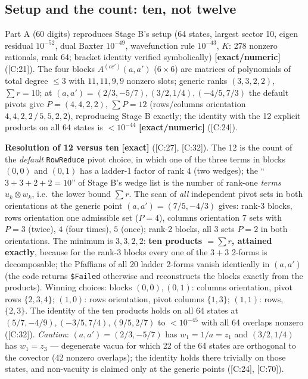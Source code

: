\documentclass[10pt]{article}
\newcommand{\cl}[2]{\textsf{[#1:#2]}}
\newcommand{\tg}[1]{\textbf{[#1]}}
\begin{document}
\subsection{Setup and the count: ten, not twelve}\label{sec:Ccount}

Part A (60 digits) reproduces Stage B's setup (64 states, largest sector 10, eigen residual $10^{-52}$, dual Baxter $10^{-49}$, wavefunction rule $10^{-43}$, $K$: 278 nonzero rationals, rank 64; bracket identity verified symbolically) \tg{exact/numeric} (\cl{C}{21}). The four blocks $A^{(cc')}(a,a')$ ($6\times6$) are matrices of polynomials of total degree $\le3$ with $11,11,9,9$ nonzero slots; generic ranks $(3,3,2,2)$, $\sum r=10$; at $(a,a')=(2/3,-5/7),(3/2,1/4),(-4/5,7/3)$ the default pivots give $P=(4,4,2,2)$, $\sum P=12$ (rows/columns orientation $4,4,2,2\,/\,5,5,2,2$), reproducing Stage B exactly; the identity with the 12 explicit products on all 64 states is $<10^{-44}$ \tg{exact/numeric} (\cl{C}{24}).

\textbf{Resolution of 12 versus ten} \tg{exact} (\cl{C}{27}, \cl{C}{32}). The 12 is the count of the \emph{default} \texttt{RowReduce} pivot choice, in which one of the three terms in blocks $(0,\allowbreak 0)$ and $(0,\allowbreak 1)$ has a ladder-1 factor of rank 4 (two wedges); the ``$3+3+2+2=10$'' of Stage B's wedge list is the number of rank-one \emph{terms} $u_k\otimes w_k$, i.e.\ the lower bound $\sum r$. The scan of \emph{all} independent pivot sets in both orientations at the generic point $(a,a')=(7/5,-4/3)$ gives: rank-3 blocks, rows orientation one admissible set ($P=4$), columns orientation 7 sets with $P=3$ (twice), $4$ (four times), $5$ (once); rank-2 blocks, all 3 sets $P=2$ in both orientations. The minimum is $3,3,2,2$: \textbf{ten products $=\sum r$, attained exactly}, because for the rank-3 blocks every one of the $3+3$ 2-forms is decomposable; the Pfaffians of all 20 ladder 2-forms vanish identically in $(a,a')$ (the code returns \texttt{\$Failed} otherwise and reconstructs the blocks exactly from the products). Winning choices: blocks $(0,0),(0,1)$: columns orientation, pivot rows $\{2,3,4\}$; $(1,\allowbreak 0)$: rows orientation, pivot columns $\{1,3\}$; $(1,\allowbreak 1)$: rows, $\{2,3\}$. The identity of the ten products holds on all 64 states at $(5/7,-4/9),(-3/5,7/4),(9/5,2/7)$ to $<10^{-45}$ with all 64 overlaps nonzero (\cl{C}{32}). \emph{Caution}: $(a,a')=(2/3,-5/7)$ has $w_1=1/a=z_1$ and $(3/2,1/4)$ has $w_1=z_3$ --- degenerate vacua for which 22 of the 64 states are orthogonal to the covector (42 nonzero overlaps); the identity holds there trivially on those states, and non-vacuity is claimed only at the generic points (\cl{C}{24}, \cl{C}{70}).
\end{document}
